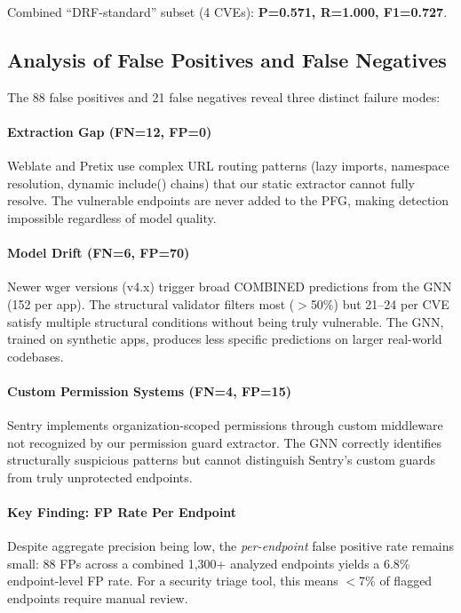 \documentclass[conference]{IEEEtran}
\begin{document}
Combined ``DRF-standard'' subset (4 CVEs): \textbf{P=0.571, R=1.000, F1=0.727}.

\subsection{Analysis of False Positives and False Negatives}

The 88 false positives and 21 false negatives reveal three distinct failure modes:

\paragraph{Extraction Gap (FN=12, FP=0)} Weblate and Pretix use complex URL routing patterns (lazy imports, namespace resolution, dynamic include() chains) that our static extractor cannot fully resolve. The vulnerable endpoints are never added to the PFG, making detection impossible regardless of model quality.

\paragraph{Model Drift (FN=6, FP=70)} Newer wger versions (v4.x) trigger broad COMBINED predictions from the GNN (152 per app). The structural validator filters most ($>$50\%) but 21--24 per CVE satisfy multiple structural conditions without being truly vulnerable. The GNN, trained on synthetic apps, produces less specific predictions on larger real-world codebases.

\paragraph{Custom Permission Systems (FN=4, FP=15)} Sentry implements organization-scoped permissions through custom middleware not recognized by our permission guard extractor. The GNN correctly identifies structurally suspicious patterns but cannot distinguish Sentry's custom guards from truly unprotected endpoints.

\paragraph{Key Finding: FP Rate Per Endpoint} Despite aggregate precision being low, the \emph{per-endpoint} false positive rate remains small: 88 FPs across a combined 1,300+ analyzed endpoints yields a 6.8\% endpoint-level FP rate. For a security triage tool, this means $<$7\% of flagged endpoints require manual review.
\end{document}
